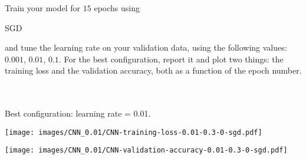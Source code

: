 \documentclass{article}
\begin{document}
{Train your model for $15$ epochs using \begin{tt}SGD\end{tt} and tune the learning rate on your validation data, using the following values: $0.001$, $0.01$, $0.1$. For the best configuration, report it and plot two things: the training loss and the validation accuracy, both as a function of the epoch number.
}\\\\
Best configuration: learning rate = 0.01.

\begin{center}
    \texttt{[image: images/CNN\_0.01/CNN-training-loss-0.01-0.3-0-sgd.pdf]}
\end{center}

\begin{center}
    \texttt{[image: images/CNN\_0.01/CNN-validation-accuracy-0.01-0.3-0-sgd.pdf]}
\end{center}
\end{document}
